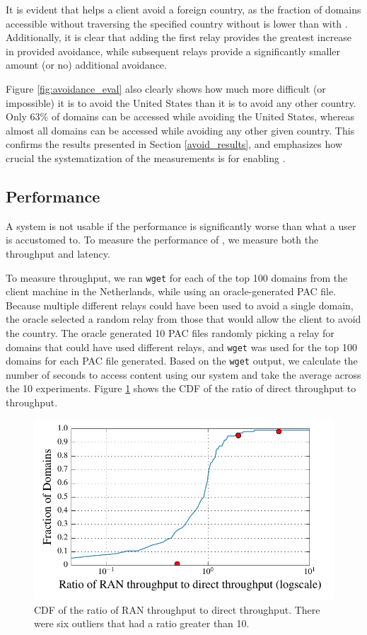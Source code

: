 It is evident that \system{} helps a client avoid a foreign country, as the 
fraction of domains accessible without traversing 
the specified country without \system{} is lower than with \system{}.  Additionally, 
it is clear that adding the first relay provides the greatest increase in 
provided avoidance, while subsequent relays provide a significantly 
smaller amount (or no) additional avoidance.

Figure \ref{fig:avoidance_eval} also clearly shows how much more difficult (or 
impossible) it is to avoid the United States than it is to avoid any other 
country.  Only 63\% of domains can be accessed while avoiding the United States, 
whereas almost all domains can be accessed while avoiding any other given 
country.  This confirms the results presented in Section \ref{avoid_results}, and 
emphasizes how crucial the systematization of the measurements is for enabling 
\system{}.

\subsection{Performance}
A system is not usable if the performance is significantly worse than what a user
is accustomed to.  To measure the performance of \system{}, we measure both 
the throughput and latency.

To measure throughput, we ran {\tt wget} for each 
of the top 100 domains from the client machine in the Netherlands, while 
using an oracle-generated PAC file.  Because multiple different relays could have been 
used to avoid a single domain, the oracle selected a random relay from those 
that would allow the client to avoid the country.  The oracle generated 
10 PAC files randomly picking a relay for domains that could have used 
different relays, and {\tt wget} was used for the top 100 domains for each 
PAC file generated.  Based on the {\tt wget} output, we calculate the number 
of seconds to access content using our system and take the average across the 
10 experiments. Figure \ref{fig:throughput} shows 
the CDF of the ratio of direct throughput to \system{} throughput. 

\begin{figure}[t]
\centering
\includegraphics[width=.5\textwidth]{throughput}
\caption{CDF of the ratio of RAN throughput to direct throughput.  
There were six outliers that had a ratio greater than 10.}
\label{fig:throughput}
\end{figure}

